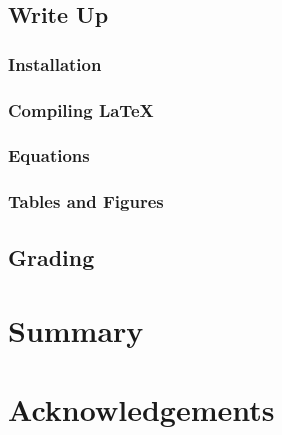 \documentclass[10pt,conference,compsocconf]{IEEEtran}
\begin{document}
\subsection{Write Up}



\subsubsection{Installation}

\subsubsection{Compiling \LaTeX{}}

\subsubsection{Equations}

\subsubsection{Tables and Figures}

\subsection{Grading}

\section{Summary}

\section*{Acknowledgements}




\end{document}
